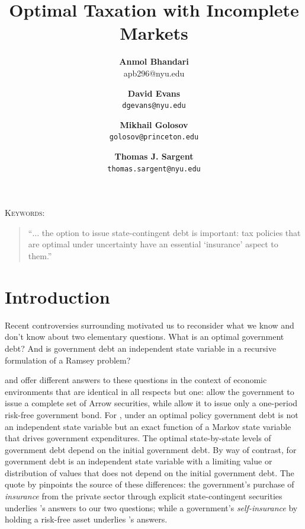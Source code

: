 \documentclass[12pt]{article}
\title {Optimal Taxation with Incomplete Markets}
\author{\textbf{Anmol Bhandari}\\apb296@nyu.edu \and \textbf{David Evans} \\ \texttt{dgevans@nyu.edu} \and \textbf{Mikhail Golosov}\\\texttt{golosov@princeton.edu} \and \textbf{Thomas J. Sargent} \\ \texttt{thomas.sargent@nyu.edu}
}
\begin{document}
\maketitle



\begin{abstract}

\end{abstract}


\noindent\textsc{Keywords:}
\begin{quote}
``$\ldots$ the option to issue state-contingent debt is important: tax policies that
are optimal under uncertainty have an essential `insurance' aspect to them.'' \quad \citet[p.~XXXX]{LucasJr.1983}
\end{quote}
\section{Introduction}


 


Recent controversies surrounding \citet{Reinhart2010} motivated us to reconsider what we know and don't know about two elementary questions.
What is an optimal  government debt? And  is government debt  an independent state variable in a recursive formulation of a Ramsey problem?  


\citet{LucasJr.1983} and \citet{Aiyagari2002} offer  different answers to these
questions in the context of  economic environments that are identical in all respects but one: \citet{LucasJr.1983} allow the government to issue
a complete set of Arrow securities, while   \citet{Aiyagari2002} allow it to issue only a one-period risk-free government bond.  For 
\citeauthor{LucasJr.1983}, under an optimal policy  government debt is not an independent state variable but an exact function of 
 a Markov state variable that  drives government expenditures.  The optimal state-by-state levels of government debt  depend on the initial
 government debt.  By way of contrast, for \citet{Aiyagari2002} government debt is an independent state variable with a limiting value or distribution
 of values that does not depend on the initial government debt.  The quote by \citeauthor{LucasJr.1983} pinpoints the source of these differences:
 the government's purchase of {\em insurance} from the private sector  through explicit state-contingent securities underlies \citeauthor{LucasJr.1983}'s
 answers to our two questions; while a government's {\em self-insurance} by holding a risk-free asset underlies \citeauthor{Aiyagari2002}'s answers.
  
\end{document}

